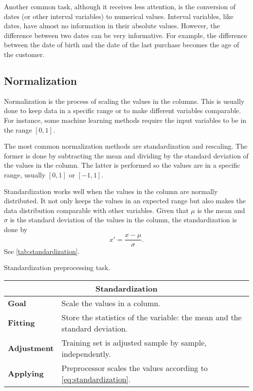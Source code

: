 Another common task, although it receives less attention, is the conversion of dates (or
other interval variables) to numerical values.  Interval variables, like dates, have
almost no information in their absolute values.  However, the difference between two
dates can be very informative.  For example, the difference between the date of birth and
the date of the last purchase becomes the age of the customer.

\subsection{Normalization}

Normalization is the process of scaling the values in the columns.  This is usually done to
keep data in a specific range or to make different variables comparable.  For instance,
some machine
learning methods require the input variables to be in the range $[0, 1]$.

The most common normalization methods are standardization and rescaling.  The former is done
by subtracting the mean and dividing by the standard deviation of the values in the column.
The latter is performed so the values are in a specific range, usually $[0, 1]$ or $[-1, 1]$.

Standardization works well when the values in the column are normally distributed.
It not only keeps the values in an expected range but also makes the data distribution
comparable with other variables.  Given that $\mu$ is the mean and $\sigma$ is the
standard deviation of the values in the column, the standardization is done by
\begin{equation}
  \label{eq:standardization}
  x' = \frac{x - \mu}{\sigma}\text{.}
\end{equation}
See \cref{tab:standardization}.

\begin{tablebox}[label=tab:standardization]{Standardization preprocessing task.}
  \centering
  \begin{tabular}{lp{6cm}}
    \toprule
    \multicolumn{2}{c}{\textbf{Standardization}} \\
    \midrule
    \textbf{Goal} &
      Scale the values in a column. \\
    \textbf{Fitting} &
      Store the statistics of the variable: the mean and the standard deviation. \\
    \textbf{Adjustment} &
      Training set is adjusted sample by sample, independently. \\
    \textbf{Applying} &
      Preprocessor scales the values according to \cref{eq:standardization}. \\
    \bottomrule
  \end{tabular}
\end{tablebox}

